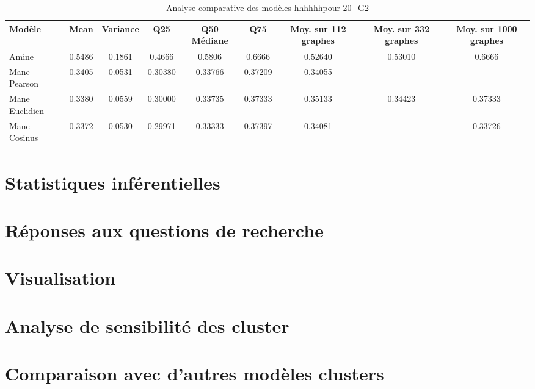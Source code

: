 \begin{table}[h]
\centering
\begin{tabular}{|l|c|c|c|c|c|c|c|c|}
\hline
\textbf{Modèle} & \textbf{Mean} & \textbf{Variance} & \textbf{Q25} & \textbf{Q50 Médiane} & \textbf{Q75} & \textbf{Moy. sur 112 graphes} & \textbf{Moy. sur 332 graphes} & \textbf{Moy. sur 1000 graphes} \\ \hline
Amine           & 0.5486        & 0.1861            & 0.4666       & 0.5806              & 0.6666       & 0.52640                      & 0.53010                       & 0.6666                         \\ \hline
Mane Pearson    & 0.3405        & 0.0531            & 0.30380      & 0.33766             & 0.37209      & 0.34055                      &                               &                                \\ \hline
Mane Euclidien  & 0.3380        & 0.0559            & 0.30000      & 0.33735             & 0.37333      & 0.35133                      & 0.34423                       & 0.37333                        \\ \hline
Mane Cosinus    & 0.3372        & 0.0530            & 0.29971      & 0.33333             & 0.37397      & 0.34081                      &                               & 0.33726                        \\ \hline
\end{tabular}
\caption{Analyse comparative des modèles hhhhhhpour 20\_G2}
\label{tab:modele_20_G2_comparaison}
\end{table}


\section{Statistiques inférentielles}
\section{Réponses aux questions de recherche}
\section{Visualisation}
\section{Analyse de sensibilité des cluster}
\section{Comparaison avec d'autres modèles clusters } 

